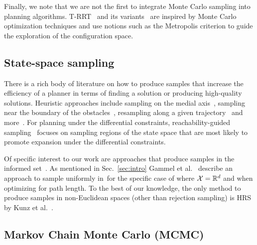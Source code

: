 \documentclass[letterpaper, 10 pt, conference]{ieeeconf}  %
\begin{document}
Finally, we note that we are not the first to integrate Monte Carlo sampling into planning algorithms. T-RRT~\cite{JCS10} and its variants~\cite{DSC13} are inspired by Monte Carlo optimization techniques and use notions such as the Metropolis criterion to guide the exploration of the configuration space.

%


\subsection{State-space sampling}
\label{subsec:sampling}
There is a rich body of literature on how to produce samples that increase the efficiency of a planner in terms of finding a solution or producing high-quality solutions.
Heuristic approaches include
sampling on the medial axis~\cite{WAS99a, WAS99b, LTA03, YDLTA14},
sampling near the boundary of the obstacles~\cite{ABDJV98, YTEA12},
resampling along a given trajectory~\cite{APD11, AS11}
and more~\cite{US03, SWT09}.
For planning under the differential constraints,
reachability-guided sampling~\cite{SWT09, PLAEFRA17} focuses on sampling regions of the state space that are most likely to promote expansion under the differential constraints.


Of specific interest to our work are approaches that produce samples in the informed set~\Cinf.
As mentioned in Sec.~\ref{sec:intro} Gammel et al.~\cite{GSB14} describe an approach to sample uniformly in~\Cinf for the specific case of where $\mathcal{X} = \mathbb{R}^d$ and when optimizing for path length.
To the best of our knowledge, the only method to produce samples in non-Euclidean spaces (other than rejection sampling) is HRS by Kunz et al.~\cite{KTC16}.

\subsection{Markov Chain Monte Carlo (MCMC)}
\label{subsec:mcmc}
\end{document}
